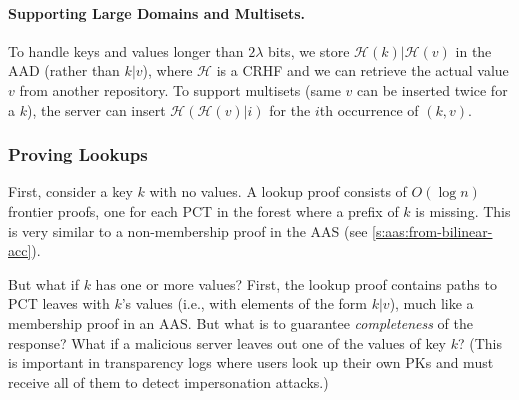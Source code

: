 \paragraph{Supporting Large Domains and Multisets.}
To handle keys and values longer than $2\lambda$ bits, we store $\mathcal{H}(k)|\mathcal{H}(v)$ in the AAD (rather than $k|v$), where $\mathcal{H}$ is a CRHF and we can retrieve the actual value $v$ from another repository.
To support multisets (same $v$ can be inserted twice for a $k$), the server can insert $\mathcal{H}(\mathcal{H}(v)|i)$ for the $i$th occurrence of $(k,v)$.

\subsubsection{Proving Lookups}
\label{s:aad:from-acc:tall:lookup-proofs}

First, consider a key $k$ with no values.
A lookup proof consists of $O(\log{n})$ frontier proofs, one for each PCT in the forest where a prefix of $k$ is missing.
This is very similar to a non-membership proof in the AAS (see \cref{s:aas:from-bilinear-acc}).

But what if $k$ has one or more values?
First, the lookup proof contains paths to PCT leaves with $k$'s values (i.e., with elements of the form $k|v$), much like a membership proof in an AAS.
But what is to guarantee \textit{completeness} of the response?
What if a malicious server leaves out one of the values of key $k$?
(This is important in transparency logs where users look up their own PKs and must receive all of them to detect impersonation attacks.)

